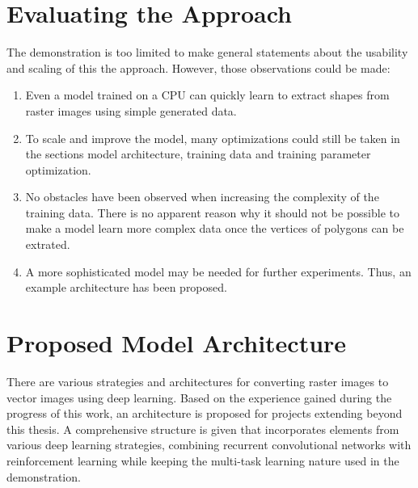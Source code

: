 \documentclass[12pt, a4paper, titlepage]{report}
\begin{document}
\section{Evaluating the Approach}

The demonstration is too limited to make general statements about the usability and scaling of this the approach.
However, those observations could be made:

\begin{enumerate}[label=\Roman*.]
   \item Even a model trained on a CPU can quickly learn to extract shapes from raster images using simple generated data.
   \item To scale and improve the model, many optimizations could still be taken in the sections model architecture, training data and training parameter optimization.
   \item No obstacles have been observed when increasing the complexity of the training data. There is no apparent reason why it should not be possible to make a model learn more complex data once the vertices of polygons can be extrated.
   \item A more sophisticated model may be needed for further experiments. Thus, an example architecture has been proposed.
\end{enumerate}



\section{Proposed Model Architecture}

There are various strategies and architectures for converting raster images to vector images using deep learning. Based on the experience gained during the progress of this work, an architecture is proposed for projects extending beyond this thesis. A comprehensive structure is given that incorporates elements from various deep learning strategies, combining recurrent convolutional networks with reinforcement learning while keeping the multi-task learning nature used in the demonstration.
\end{document}
